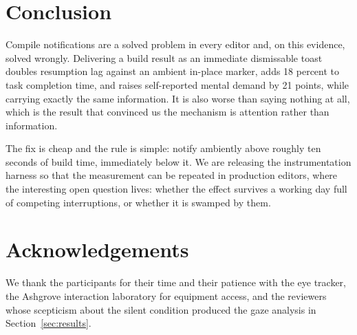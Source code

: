 \section{Conclusion}
\label{sec:conclusion}

Compile notifications are a solved problem in every editor and, on this
evidence, solved wrongly. Delivering a build result as an immediate dismissable
toast doubles resumption lag against an ambient in-place marker, adds 18
percent to task completion time, and raises self-reported mental demand by 21
points, while carrying exactly the same information. It is also worse than
saying nothing at all, which is the result that convinced us the mechanism is
attention rather than information.

The fix is cheap and the rule is simple: notify ambiently above roughly ten
seconds of build time, immediately below it. We are releasing the
instrumentation harness so that the measurement can be repeated in production
editors, where the interesting open question lives: whether the effect survives
a working day full of competing interruptions, or whether it is swamped by
them.

\section*{Acknowledgements}
We thank the participants for their time and their patience with the eye
tracker, the Ashgrove interaction laboratory for equipment access, and the
reviewers whose scepticism about the silent condition produced the gaze
analysis in Section~\ref{sec:results}.
